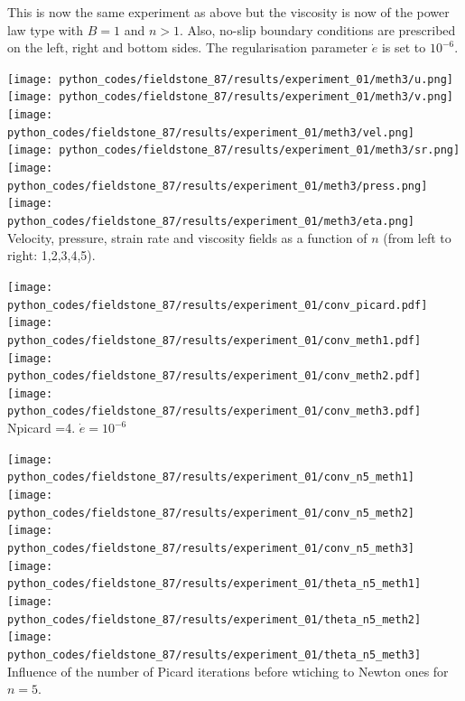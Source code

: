 This is now the same experiment as above but the viscosity is now of the 
power law type with $B=1$ and $n>1$. Also, no-slip boundary conditions 
are prescribed on the left, right and bottom sides. 
The regularisation parameter $\dot{e}$ is set to $10^{-6}$.

\begin{center}
\texttt{[image: python\_codes/fieldstone\_87/results/experiment\_01/meth3/u.png]}
\texttt{[image: python\_codes/fieldstone\_87/results/experiment\_01/meth3/v.png]}\\
\texttt{[image: python\_codes/fieldstone\_87/results/experiment\_01/meth3/vel.png]}
\texttt{[image: python\_codes/fieldstone\_87/results/experiment\_01/meth3/sr.png]}\\
\texttt{[image: python\_codes/fieldstone\_87/results/experiment\_01/meth3/press.png]}
\texttt{[image: python\_codes/fieldstone\_87/results/experiment\_01/meth3/eta.png]}\\
{\captionfont Velocity, pressure, strain rate and viscosity fields as a function 
of $n$ (from left to right: 1,2,3,4,5).} 
\end{center}

\begin{center}
\texttt{[image: python\_codes/fieldstone\_87/results/experiment\_01/conv\_picard.pdf]}
\texttt{[image: python\_codes/fieldstone\_87/results/experiment\_01/conv\_meth1.pdf]}\\
\texttt{[image: python\_codes/fieldstone\_87/results/experiment\_01/conv\_meth2.pdf]}
\texttt{[image: python\_codes/fieldstone\_87/results/experiment\_01/conv\_meth3.pdf]}\\
{\captionfont Npicard =4. $\dot{e}=10^{-6}$}
\end{center}


\begin{center}
\texttt{[image: python\_codes/fieldstone\_87/results/experiment\_01/conv\_n5\_meth1]}
\texttt{[image: python\_codes/fieldstone\_87/results/experiment\_01/conv\_n5\_meth2]}
\texttt{[image: python\_codes/fieldstone\_87/results/experiment\_01/conv\_n5\_meth3]}\\
\texttt{[image: python\_codes/fieldstone\_87/results/experiment\_01/theta\_n5\_meth1]}
\texttt{[image: python\_codes/fieldstone\_87/results/experiment\_01/theta\_n5\_meth2]}
\texttt{[image: python\_codes/fieldstone\_87/results/experiment\_01/theta\_n5\_meth3]}\\
{\captionfont Influence of the number of Picard iterations before wtiching to Newton ones for $n=5$.}
\end{center}


